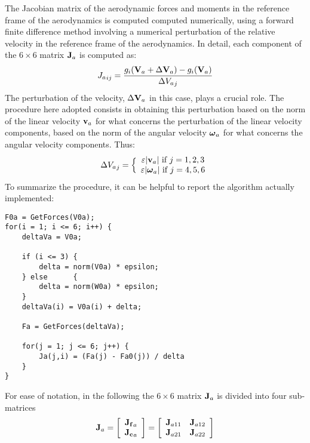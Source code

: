 The Jacobian matrix of the aerodynamic forces and moments in the reference 
frame of the aerodynamics is computed computed numerically,
using a forward finite difference method involving a numerical perturbation
of the relative velocity in the reference frame of the aerodynamics.
In detail, each component of the $6\times6$ matrix $\T{J}_a$ is computed as:
\begin{equation}
	{J_a}_{ij} = \frac{g_i(\T{V}_a + \Delta\T{V}_a) 
		- g_i(\T{V}_a)}{\Delta {V_a}_j}
\end{equation}
The perturbation of the velocity, $\Delta\T{V}_a$ in this case, plays
a crucial role. The procedure here adopted consists in obtaining this
perturbation based on the norm of the linear velocity $\T{v}_a$ for what 
concerns the perturbation of the linear velocity components, based on
the norm of the angular velocity $\T{\omega}_a$ for what concerns 
the angular velocity components. Thus:
\begin{equation}
	\Delta {V_a}_j = \Bigl\{\matr{c}{
		\varepsilon\lvert\T{v}_a\lvert\text{ if $j = 1,2,3$}\\
		\varepsilon\lvert\T{\omega}_a\lvert\text{ if $j = 4,5,6$}
		}
\end{equation}
To summarize the procedure, it can be helpful to report the algorithm
actually implemented:
\begin{verbatim}
F0a = GetForces(V0a);
for(i = 1; i <= 6; i++)	{
    deltaVa = V0a; 
				
    if (i <= 3)	{
        delta = norm(V0a) * epsilon;
    } else		{
        delta = norm(W0a) * epsilon;
    }
    deltaVa(i) = V0a(i) + delta;
					
    Fa = GetForces(deltaVa);
	
    for(j = 1; j <= 6; j++)	{
        Ja(j,i) = (Fa(j) - Fa0(j)) / delta 
    }
}
\end{verbatim}

For ease of notation, in the following the $6\times6$ matrix $\T{J}_a$ is 
divided into four sub-matrices
\begin{equation}\label{eq:JaSub}
	\T{J}_a = \sqbr{\matr{c}{\T{J_f}_a\\\T{J_c}_a}}
	=\sqbr{\matr{cc}{\T{J}_{a11} & \T{J}_{a12}\\ \T{J}_{a21} & \T{J}_{a22}}}
\end{equation}

